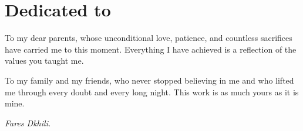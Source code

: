 \chapter*{Dedicated to}

  \begin{dedication}
  
    To my dear parents, whose unconditional love, patience, and countless
    sacrifices have carried me to this moment. Everything I have achieved is
    a reflection of the values you taught me.
    
    \par   %
    \vspace{1\baselineskip}
    
    To my family and my friends, who never stopped believing in me and who
    lifted me through every doubt and every long night. This work is as much
    yours as it is mine.

    \vspace{\baselineskip}
    \textit{Fares Dkhili.}
  \end{dedication}



